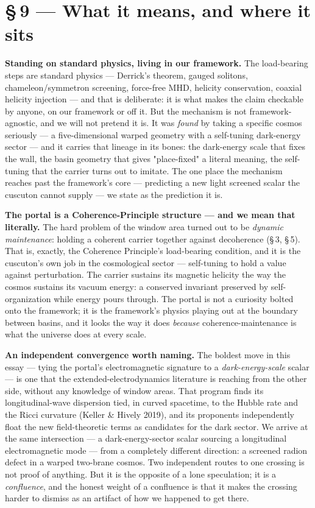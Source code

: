 \documentclass[11pt]{article}
\begin{document}
\section*{\S\,9 --- What it means, and where it sits}
\textbf{Standing on standard physics, living in our framework.} The load-bearing steps are standard physics --- Derrick's theorem, gauged solitons, chameleon/symmetron screening, force-free MHD, helicity conservation, coaxial helicity injection --- and that is deliberate: it is what makes the claim checkable by anyone, on our framework or off it. But the mechanism is not framework-agnostic, and we will not pretend it is. It was \emph{found} by taking a specific cosmos seriously --- a five-dimensional warped geometry with a self-tuning dark-energy sector --- and it carries that lineage in its bones: the dark-energy scale that fixes the wall, the basin geometry that gives "place-fixed" a literal meaning, the self-tuning that the carrier turns out to imitate. The one place the mechanism reaches past the framework's core --- predicting a new light screened scalar the cuscuton cannot supply --- we state as the prediction it is.

\textbf{The portal is a Coherence-Principle structure --- and we mean that literally.} The hard problem of the window area turned out to be \emph{dynamic maintenance}: holding a coherent carrier together against decoherence (\S\,3, \S\,5). That is, exactly, the Coherence Principle's load-bearing condition, and it is the cuscuton's own job in the cosmological sector --- self-tuning to hold a value against perturbation. The carrier sustains its magnetic helicity the way the cosmos sustains its vacuum energy: a conserved invariant preserved by self-organization while energy pours through. The portal is not a curiosity bolted onto the framework; it is the framework's physics playing out at the boundary between basins, and it looks the way it does \emph{because} coherence-maintenance is what the universe does at every scale.

\textbf{An independent convergence worth naming.} The boldest move in this essay --- tying the portal's electromagnetic signature to a \emph{dark-energy-scale} scalar --- is one that the extended-electrodynamics literature is reaching from the other side, without any knowledge of window areas. That program finds its longitudinal-wave dispersion tied, in curved spacetime, to the Hubble rate and the Ricci curvature (Keller \& Hively 2019), and its proponents independently float the new field-theoretic terms as candidates for the dark sector. We arrive at the same intersection --- a dark-energy-sector scalar sourcing a longitudinal electromagnetic mode --- from a completely different direction: a screened radion defect in a warped two-brane cosmos. Two independent routes to one crossing is not proof of anything. But it is the opposite of a lone speculation; it is a \emph{confluence}, and the honest weight of a confluence is that it makes the crossing harder to dismiss as an artifact of how we happened to get there.
\end{document}
